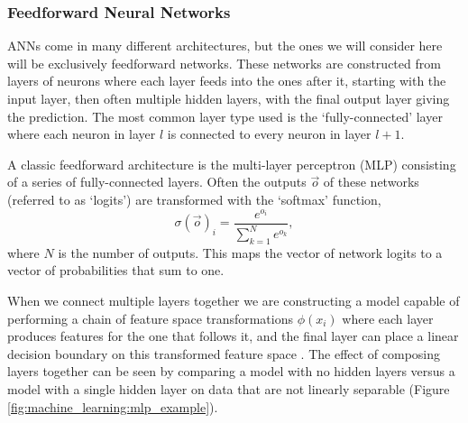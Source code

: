 \subsubsection{Feedforward Neural Networks}
ANNs come in many different architectures, but the ones we will consider here will be exclusively feedforward networks. 
These networks are constructed from layers of neurons where each layer feeds into the ones after it, starting with the input layer, then often multiple hidden layers, with the final output layer giving the prediction. 
The most common layer type used is the `fully-connected' layer where each neuron in layer $l$ is connected to every neuron in layer $l+1$. 

A classic feedforward architecture is the multi-layer perceptron (MLP) consisting of a series of fully-connected layers. Often the outputs $\vec{o}$ of these networks (referred to as `logits') are transformed with the `softmax' function,
\begin{equation}
    \sigma(\vec{o})_{i} = \frac{e^{o_{i}}}{\sum_{k=1}^{N}e^{o_{k}}},
\end{equation}
where $N$ is the number of outputs. 
This maps the vector of network logits to a vector of probabilities that sum to one.

When we connect multiple layers together we are constructing a model capable of performing a chain of feature space transformations $\phi(x_{i})$ where each layer produces features for the one that follows it, and the final layer can place a linear decision boundary on this transformed feature space \cite{DeepLearningBook}. 
The effect of composing layers together can be seen by comparing a model with no hidden layers versus a model with a single hidden layer on data that are not linearly separable (Figure \ref{fig:machine_learning:mlp_example}).

